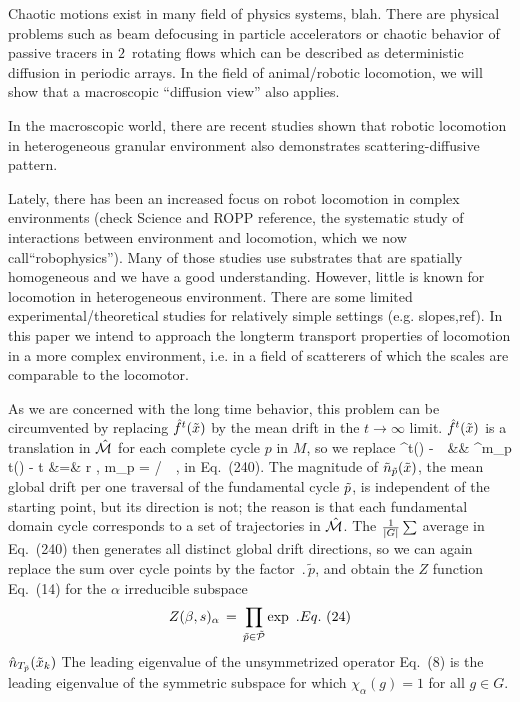 Chaotic motions exist in many field of physics systems, blah. There are
physical problems such as beam defocusing in particle accelerators or
chaotic behavior of passive tracers in $2$\dmn\ rotating flows which can
be described as deterministic diffusion in periodic arrays. In the field
of animal/robotic locomotion, we will show that a macroscopic ``diffusion
view'' also applies.

In the macroscopic world, there are recent
studies shown that robotic locomotion in heterogeneous granular
environment also demonstrates scattering-diffusive pattern.

Lately, there has been an increased focus on robot locomotion in complex
environments (check Science and ROPP reference, the systematic study of
interactions between environment and locomotion, which we now
call``robophysics''). Many of those studies use substrates that are
spatially homogeneous and we have a good
understanding. However, little is
known for locomotion in heterogeneous environment. There are some limited
experimental/theoretical studies for relatively simple settings (e.g.
slopes,ref). In this paper we intend to approach the longterm transport
properties of locomotion in a more complex environment, i.e. in a field
of scatterers of which the scales are comparable to the locomotor.


 As we are concerned with the long time behavior,
 this problem can be circumvented
 by replacing $ \hat f^t(\tilde x{}) $ by the mean
 drift in the $t \rightarrow \infty$ limit.
 $ \hat f^t(\tilde x{}) $ is a translation in $\hat {{\cal M}}$ for each
 complete cycle $p$ in $M$, so we replace
 \bea
 \hf^t(\tx{\tpk}) - \tx{\tpk}
 \,\Longrightarrow \,
 &&
 { { \hf^{m_p t}(\tx{\tpk}) - \tx{\tpk} }
 }
 \continue
t &=& r , \quad m_p = / \quad \tx \in \tp \,\, ,
 \eea
 in Eq.~(240).
 The magnitude of ${\tilde n}_{{\tilde p}}(\tilde x{})$, the mean
 global drift per one traversal of the fundamental cycle ${\tilde p}$, is
 independent of the starting point, but its direction is not; the
 reason is that each fundamental domain cycle corresponds to a set of
 trajectories in $\hat {{\cal M}}$.
 The ${1 \over {|G|}} \sum$ average in
 Eq.~(240) then generates all distinct global drift
 directions, so we can again replace the
 sum over cycle points by the factor $\period{\tilde{p}}$, and obtain the
 $Z$ function Eq.~(14) for the $\alpha $ irreducible subspace
 $$
 Z(\beta,s)_\alpha\,=\,\prod_{{\tilde p} \in \tilde{\cal{P}} } \exp
 \,\, .
 Eq.~(24)
 $$
 $\hat{n}_{{T_{\tilde{p}}}}(\tilde x_k)$
 The leading eigenvalue of the
unsymmetrized
 operator Eq.~(8) is
 the leading eigenvalue of the symmetric subspace for which
 $\chi_\alpha(g)=1$ for all $g \in G$.

